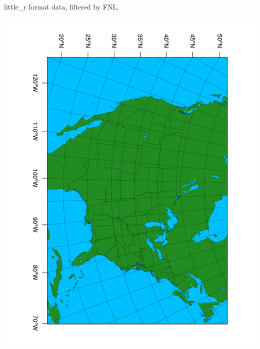 \documentclass[10pt]{beamer}
\begin{document}
{\begin{itemize}
little\_r format data, filtered by FNL.
\end{itemize}
\begin{center}
\includegraphics[scale=0.25, trim=0 0 50 0, clip, angle=90]{domain.pdf} 
\end{center}
}
\end{document}
